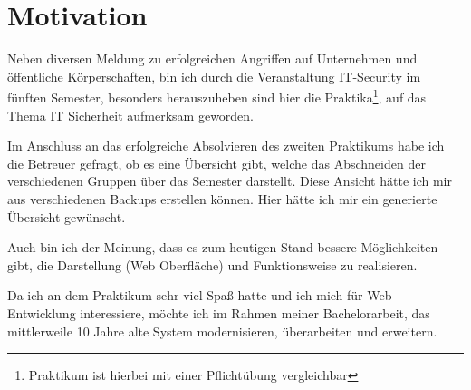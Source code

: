 \section{Motivation}
Neben diversen Meldung zu erfolgreichen Angriffen auf Unternehmen und öffentliche Körperschaften, bin ich durch die Veranstaltung IT-Security im fünften Semester, besonders herauszuheben sind hier die Praktika\footnote{Praktikum ist hierbei mit einer Pflichtübung vergleichbar}, auf das Thema IT Sicherheit aufmerksam geworden. 

Im Anschluss an das erfolgreiche Absolvieren des zweiten Praktikums  habe ich die Betreuer gefragt, ob es eine Übersicht gibt, welche das Abschneiden der verschiedenen Gruppen über das Semester darstellt.
Diese Ansicht hätte ich mir aus verschiedenen Backups erstellen können. Hier hätte ich mir ein generierte Übersicht gewünscht.

Auch bin ich der Meinung, dass es zum heutigen Stand bessere Möglichkeiten gibt, die Darstellung (Web Oberfläche) und Funktionsweise zu realisieren. 

Da ich an dem Praktikum sehr viel Spaß hatte und ich mich für Web-Entwicklung interessiere, möchte ich im Rahmen meiner Bachelorarbeit, das mittlerweile 10 Jahre alte System modernisieren, überarbeiten und erweitern.